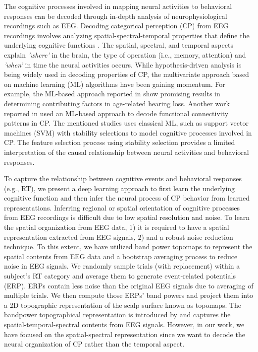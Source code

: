 \documentclass{article}
\begin{document}
The cognitive processes involved in mapping neural activities to behavioral responses can be decoded through in-depth analysis of neurophysiological recordings such as EEG. Decoding categorical perception (CP) from EEG recordings involves analyzing spatial-spectral-temporal properties that define the underlying cognitive functions \cite{beta2, Mahmud_2, Mahmud2019}. The spatial, spectral, and temporal aspects explain \emph{'where'} in the brain, the type of operation (i.e., memory, attention) and  \emph{'when'} in time the neural activities occurs. While hypothesis-driven analysis is being widely used in decoding properties of CP, the multivariate approach based on machine learning (ML) algorithms have been gaining momentum. For example, the ML-based approach reported in \cite{Mahmud2019, Mahmud_2} show promising results in determining contributing factors in age-related hearing loss. Another work reported in \cite{Al_Fahad_2020} used an ML-based approach to decode functional connectivity patterns in CP. The mentioned studies uses classical ML, such as support vector machines (SVM) \cite{svm} with stability selections \cite{stability_selection} to model cognitive processes involved in CP. The feature selection process using stability selection provides a limited interpretation of the causal relationship between neural activities and behavioral responses.

To capture the relationship between cognitive events and behavioral responses (e.g., RT), we present a deep learning approach to first learn the underlying cognitive function and then infer the neural process of CP behavior from learned representations. Inferring regional or spatial orientation of cognitive processes from EEG recordings is difficult due to low spatial resolution and noise. To learn the spatial organization from EEG data, 1) it is required to have a spatial representation extracted from EEG signals, 2) and a robust noise reduction technique. To this extent, we have utilized band power topomaps to represent the spatial contents from EEG data and a bootstrap averaging process to reduce noise in EEG signals. We randomly sample trials (with replacement) within a subject's RT category and average them to generate event-related potentials (ERP). ERPs contain less noise than the original EEG signals due to averaging of multiple trials. We then compute those ERPs' band powers and project them into a 2D topographic representation of the scalp surface known as topomaps. The bandpower topographical representation is introduced by \cite{bashivan2015} and captures the spatial-temporal-spectral contents from EEG signals. However, in our work, we have focused on the spatial-spectral representation since we want to decode the neural organization of CP rather than the temporal aspect.
\end{document}
